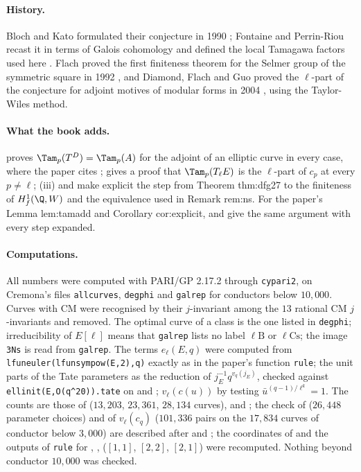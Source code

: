 \paragraph{History.} Bloch and Kato formulated their conjecture in 1990 \cite{BlochKato}; Fontaine and Perrin-Riou recast it in terms of Galois cohomology and defined
the local Tamagawa factors used here \cite{FPR94}. Flach proved the first finiteness theorem for the Selmer group of the symmetric square in 1992 \cite{Flach92}, and
Diamond, Flach and Guo proved the $\ell$-part of the conjecture for adjoint motives of modular forms in 2004 \cite{DFG04}, using the Taylor-Wiles method.

\paragraph{What the book adds.}  proves $\Tam_p(T^D)=\Tam_p(A)$ for the adjoint of an elliptic curve in every case, where the paper cites \cite[(57)]{DFG04};
 gives a proof that $\Tam_p(T_\ell E)$ is the $\ell$-part of $c_p$ at every $p\ne\ell$; (iii) and
 make explicit the step from Theorem thm:dfg27 to the finiteness of $H^1_f(\Q,W)$ and the equivalence used in Remark rem:ns. For the paper's Lemma
lem:tamadd and Corollary cor:explicit,  and  give the same argument with every step expanded.

\paragraph{Computations.} All numbers were computed with PARI/GP 2.17.2 \cite{PARI} through \texttt{cypari2}, on Cremona's files \texttt{allcurves}, \texttt{degphi} and
\texttt{galrep} \cite{ecdata} for conductors below $10{,}000$. Curves with CM were recognised by their $j$-invariant among the $13$ rational CM $j$-invariants and removed. The
optimal curve of a class is the one listed in \texttt{degphi}; irreducibility of $E[\ell]$ means that \texttt{galrep} lists no label $\ell\mathrm B$ or $\ell\mathrm{Cs}$; the image \texttt{3Ns} is
read from \texttt{galrep}. The terms $e_\ell(E,q)$ were computed from \texttt{lfuneuler(lfunsympow(E,2),q)} exactly as in the paper's function \texttt{rule}; the unit parts of the
Tate parameters as the reduction of $j_E^{-1}q^{v_q(j_E)}$, checked against \texttt{ellinit(E,O(q\^{}20)).tate} on  and ; $v_\ell(c(u))$ by testing
$\bar u^{(q-1)/\ell^k}=1$. The counts are those of  ($13{,}203$, $23{,}361$, $28{,}134$ curves),  and
; the check of  ($26{,}448$ parameter choices) and of $v_\ell(c_q)$ ($101{,}336$ pairs on the $17{,}834$ curves of conductor
below $3{,}000$) are described after  and ; the coordinates of  and the outputs of
\texttt{rule} for , ,  ($[1,1]$, $[2,2]$, $[2,1]$) were recomputed. Nothing beyond conductor $10{,}000$ was checked.

